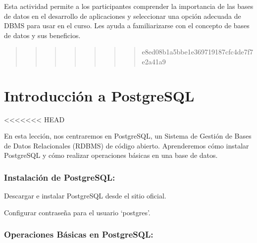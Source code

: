 \documentclass[
  a4paper,
  onepage,
  openany]{scrreprt}
\begin{document}
Esta actividad permite a los participantes comprender la importancia de
las bases de datos en el desarrollo de aplicaciones y seleccionar una
opción adecuada de DBMS para usar en el curso. Les ayuda a
familiarizarse con el concepto de bases de datos y sus beneficios.

\begin{quote}
\begin{quote}
\begin{quote}
\begin{quote}
\begin{quote}
\begin{quote}
\begin{quote}
e8ed08b1a5bbe1e369719187cfc4de7f7e2a41a9
\end{quote}
\end{quote}
\end{quote}
\end{quote}
\end{quote}
\end{quote}
\end{quote}

\hypertarget{introducciuxf3n-a-postgresql}{%
\chapter{Introducción a PostgreSQL}\label{introducciuxf3n-a-postgresql}}

\textless\textless\textless\textless\textless\textless\textless{} HEAD

En esta lección, nos centraremos en PostgreSQL, un Sistema de Gestión de
Bases de Datos Relacionales (RDBMS) de código abierto. Aprenderemos cómo
instalar PostgreSQL y cómo realizar operaciones básicas en una base de
datos.

\hypertarget{instalaciuxf3n-de-postgresql}{%
\subsection{Instalación de
PostgreSQL:}\label{instalaciuxf3n-de-postgresql}}

Descargar e instalar PostgreSQL desde el sitio oficial.

Configurar contraseña para el usuario `postgres'.

\hypertarget{operaciones-buxe1sicas-en-postgresql}{%
\subsection{Operaciones Básicas en
PostgreSQL:}\label{operaciones-buxe1sicas-en-postgresql}}
\end{document}
